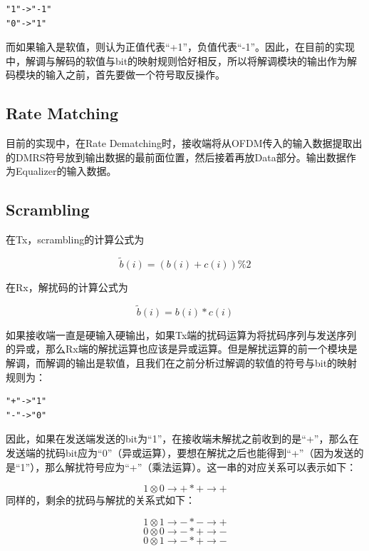 \documentclass[titlepage]{article}
\numberwithin{figure}{section}
\numberwithin{equation}{section}
\begin{document}
\begin{verbatim}
"1"->"-1"
"0"->"1"
\end{verbatim}

而如果输入是软值，则认为正值代表“+1”，负值代表“-1”。因此，在目前的实现中，解调与解码的软值与bit的映射规则恰好相反，所以将解调模块的输出作为解码模块的输入之前，首先要做一个符号取反操作。

\subsection{Rate Matching}

目前的实现中，在Rate Dematching时，接收端将从OFDM传入的输入数据提取出的DMRS符号放到输出数据的最前面位置，然后接着再放Data部分。输出数据作为Equalizer的输入数据。

\subsection{Scrambling}

在Tx，scrambling的计算公式为

\begin{displaymath}
  {\tilde b(i)}=(b(i)+c(i))\%2
\end{displaymath}

在Rx，解扰码的计算公式为

\begin{displaymath}
  {\tilde b(i)}=b(i)*c(i)
\end{displaymath}

如果接收端一直是硬输入硬输出，如果Tx端的扰码运算为将扰码序列与发送序列的异或，那么Rx端的解扰运算也应该是异或运算。但是解扰运算的前一个模块是解调，而解调的输出是软值，且我们在之前分析过解调的软值的符号与bit的映射规则为：

\begin{verbatim}
"+"->"1"
"-"->"0"
\end{verbatim}

因此，如果在发送端发送的bit为“1”，在接收端未解扰之前收到的是“+”，那么在发送端的扰码bit应为“0”（异或运算），要想在解扰之后也能得到“+”（因为发送的是“1”），那么解扰符号应为“+”（乘法运算）。这一串的对应关系可以表示如下：

\begin{displaymath}
1 \otimes 0 \to + * + \to +
\end{displaymath}
同样的，剩余的扰码与解扰的关系式如下：

\begin{displaymath}
1 \otimes 1 \to - * - \to +
\end{displaymath}
\begin{displaymath}
0 \otimes 0 \to - * + \to -
\end{displaymath}
\begin{displaymath}
0 \otimes 1 \to - * + \to - 
\end{displaymath}
\end{document}
